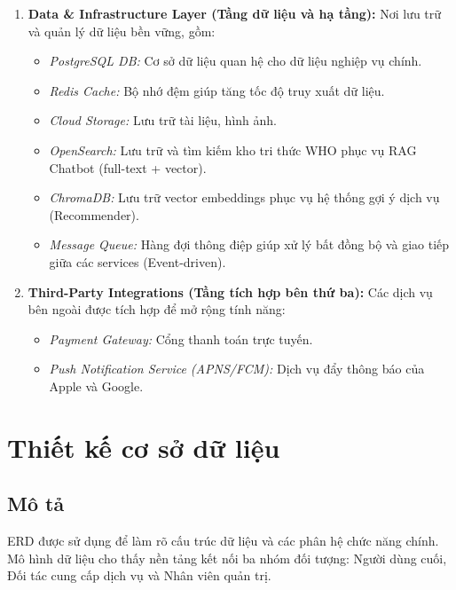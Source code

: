 \begin{enumerate}
    \item \textbf{Data \& Infrastructure Layer (Tầng dữ liệu và hạ tầng):}
    Nơi lưu trữ và quản lý dữ liệu bền vững, gồm:
    \begin{itemize}
        \item \textit{PostgreSQL DB:} Cơ sở dữ liệu quan hệ cho dữ liệu nghiệp vụ chính.
        \item \textit{Redis Cache:} Bộ nhớ đệm giúp tăng tốc độ truy xuất dữ liệu.
        \item \textit{Cloud Storage:} Lưu trữ tài liệu, hình ảnh.
        \item \textit{OpenSearch:} Lưu trữ và tìm kiếm kho tri thức WHO phục vụ RAG Chatbot (full-text + vector).
        \item \textit{ChromaDB:} Lưu trữ vector embeddings phục vụ hệ thống gợi ý dịch vụ (Recommender).
        \item \textit{Message Queue:} Hàng đợi thông điệp giúp xử lý bất đồng bộ và giao tiếp giữa các services (Event-driven).
    \end{itemize}

    \item \textbf{Third-Party Integrations (Tầng tích hợp bên thứ ba):}
    Các dịch vụ bên ngoài được tích hợp để mở rộng tính năng:
    \begin{itemize}
        \item \textit{Payment Gateway:} Cổng thanh toán trực tuyến.
        \item \textit{Push Notification Service (APNS/FCM):} Dịch vụ đẩy thông báo của Apple và Google.
    \end{itemize}
\end{enumerate}

\section{Thiết kế cơ sở dữ liệu}
\subsection{Mô tả}
ERD được sử dụng để làm rõ cấu trúc dữ liệu và các phân hệ chức năng chính. Mô hình dữ liệu cho thấy nền tảng kết nối ba nhóm đối tượng: Người dùng cuối, Đối tác cung cấp dịch vụ và Nhân viên quản trị.
